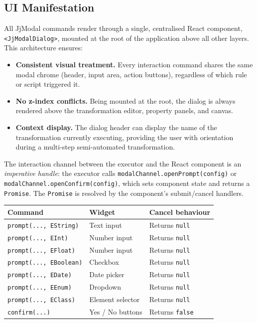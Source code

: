 \documentclass[11pt,a4paper]{article}
\newcommand{\jjmodal}{\textsf{JjModal}}
\begin{document}
\subsection{UI Manifestation}
 
All \jjmodal{} commands render through a single, centralised React
component, \texttt{<JjModalDialog>}, mounted at the root of the
application above all other layers. This architecture ensures:
 
\begin{itemize}
    \item \textbf{Consistent visual treatment.} Every interaction command
          shares the same modal chrome (header, input area, action
          buttons), regardless of which rule or script triggered it.
    \item \textbf{No z-index conflicts.} Being mounted at the root, the
          dialog is always rendered above the transformation editor,
          property panels, and canvas.
    \item \textbf{Context display.} The dialog header can display the
          name of the transformation currently executing, providing the
          user with orientation during a multi-step semi-automated
          transformation.
\end{itemize}
 
The interaction channel between the executor and the React component is
an \emph{imperative handle}: the executor calls
\texttt{modalChannel.openPrompt(config)} or
\texttt{modalChannel.openConfirm(config)}, which sets component state
and returns a \texttt{Promise}. The \texttt{Promise} is resolved by the
component's submit/cancel handlers.
 
\begin{center}
\begin{tabular}{@{}lll@{}}
\toprule
\textbf{Command} & \textbf{Widget} & \textbf{Cancel behaviour} \\
\midrule
\texttt{prompt(..., EString)}      & Text input        & Returns \texttt{null} \\
\texttt{prompt(..., EInt)}         & Number input      & Returns \texttt{null} \\
\texttt{prompt(..., EFloat)}       & Number input      & Returns \texttt{null} \\
\texttt{prompt(..., EBoolean)}     & Checkbox          & Returns \texttt{null} \\
\texttt{prompt(..., EDate)}        & Date picker       & Returns \texttt{null} \\
\texttt{prompt(..., EEnum)}        & Dropdown          & Returns \texttt{null} \\
\texttt{prompt(..., EClass)}       & Element selector  & Returns \texttt{null} \\
\texttt{confirm(...)}              & Yes / No buttons  & Returns \texttt{false} \\
\bottomrule
\end{tabular}
\end{center}
 
\end{document}

